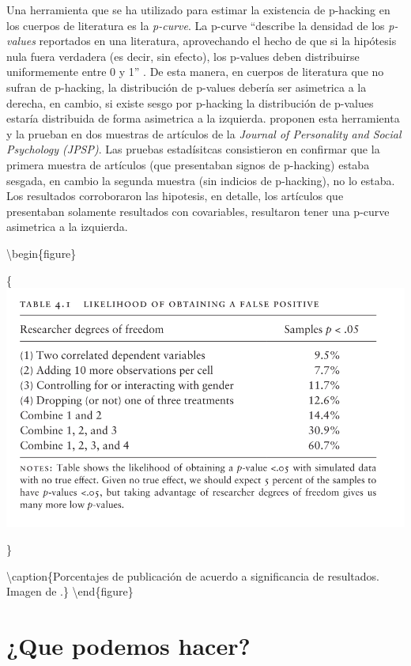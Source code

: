 \documentclass[
]{book}
\begin{document}
Una herramienta que se ha utilizado para estimar la existencia de p-hacking en los cuerpos de literatura es la \emph{p-curve}. La p-curve ``describe la densidad de los \emph{p-values} reportados en una literatura, aprovechando el hecho de que si la hipótesis nula fuera verdadera (es decir, sin efecto), los p-values deben distribuirse uniformemente entre 0 y 1'' \citep[p.67.]{christensen_Transparent_2019}. De esta manera, en cuerpos de literatura que no sufran de p-hacking, la distribución de p-values debería ser asimetrica a la derecha, en cambio, si existe sesgo por p-hacking la distribución de p-values estaría distribuida de forma asimetrica a la izquierda. \citet{simonsohn_Pcurve_2014} proponen esta herramienta y la prueban en dos muestras de artículos de la \emph{Journal of Personality and Social Psychology (JPSP)}. Las pruebas estadísitcas consistieron en confirmar que la primera muestra de artículos (que presentaban signos de p-hacking) estaba sesgada, en cambio la segunda muestra (sin indicios de p-hacking), no lo estaba. Los resultados corroboraron las hipotesis, en detalle, los artículos que presentaban solamente resultados con covariables, resultaron tener una p-curve asimetrica a la izquierda.

\textbackslash begin\{figure\}

\{\centering \includegraphics[width=1\linewidth]{docs/images/fp}

\}

\textbackslash caption\{Porcentajes de publicación de acuerdo a significancia de resultados. Imagen de \citet{christensen_Transparent_2019}.\}\label{fig:written}
\textbackslash end\{figure\}

\hypertarget{que-podemos-hacer}{%
\section{¿Que podemos hacer?}\label{que-podemos-hacer}}
\end{document}
